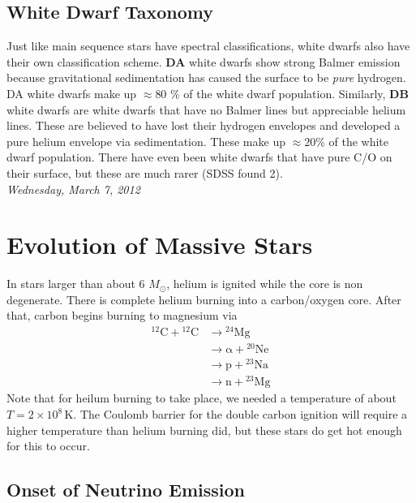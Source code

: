 \documentclass[10pt]{article}
\numberwithin{equation}{section}
\newcommand{\n}{\noindent}
\begin{document}
    \subsection{White Dwarf Taxonomy} %
    \label{sub:white_dwarf_taxonomy}
    Just like main sequence stars have spectral classifications, white dwarfs
    also have their own classification scheme. \textbf{DA} white dwarfs show
    strong Balmer emission because gravitational sedimentation has caused the
    surface to be \emph{pure} hydrogen. DA white dwarfs make up $\approx 80$ \%
    of the white dwarf population. Similarly, \textbf{DB} white dwarfs are
    white dwarfs that have no Balmer lines but appreciable helium lines. These
    are believed to have lost their hydrogen envelopes and developed a pure
    helium envelope via sedimentation. These make up $\approx 20$\% of the
    white dwarf population. There have even been white dwarfs that have pure
    C/O on their surface, but these are much rarer (SDSS found 2).\\

    \n \textit{Wednesday, March 7, 2012}
    \section{Evolution of Massive Stars}
    \label{sec:evolution-gt-6}
    In stars larger than about 6 $M_\odot$, helium is ignited while
    the core is non degenerate. There is complete helium burning into
    a carbon/oxygen core. After that, carbon begins burning to
    magnesium via
    \begin{align}
      \label{eq:336}
      \mathrm{{}^{12}C+{}^{12}C}&\to \mathrm{{}^{24}Mg}\\
      &\to \mathrm{\alpha+{}^{20}Ne}\\
      &\to \mathrm{p+{}^{23}Na}\\
      &\to \mathrm{n+{}^{23}Mg}
    \end{align}
    Note that for heilum burning to take place, we needed a
    temperature of about $T=2\times 10^8\,\mathrm{K}$. The Coulomb
    barrier for the double carbon ignition will require a higher
    temperature than helium burning did, but these stars do get hot
    enough for this to occur. 

    \subsection{Onset of Neutrino Emission}
    \label{sec:onset-neutr-emiss}
\end{document}
